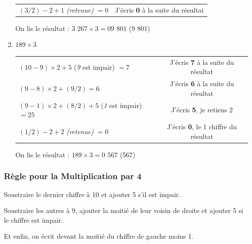 \documentclass[a4paper]{article}
\begin{document}
\begin{small}
\begin{enumerate}
\begin{tabular}{l|c}
		\tabularnewline
		
		$(3 / 2) - 2 + 1$ \textit{(retenue)} $= 0$ & J'écris \textbf{0} à la suite du résultat
		
		\tabularnewline

	\end{tabular}
	
	On lis le résultat : {\boldmath $3$ $267 \times 3 = 09$ $801$} (9 801)\\




	\item $189 \times 3$
	
	\begin{tabular}{l|c}
	
		$(10 - 9) \times 2 + 5$ (\textit{9} est impair) $= 7$ & J'écris \textbf{7} à la suite du résultat
		
		\tabularnewline
		
		$(9 - 8) \times 2 + (9 / 2) = 6$ & J'écris \textbf{6} à la suite du résultat
		
		\tabularnewline
		
		$(9 - 1) \times 2 + (8 / 2) + 5$ (\textit{1} est impair) $= 25$ & J'écris \textbf{5}, je retiens 2
		
		\tabularnewline
		
		$(1 / 2) - 2 + 2$ \textit{(retenue)} $= 0$ & J'écris \textbf{0}, le 1\up{er} chiffre du résultat

	\end{tabular}
	
	On lis le résultat : {\boldmath $189 \times 3 = 0$ $567$} (567)\\

\end{enumerate}
\end{small}

\vfill
{\noindent \dotfill}

\subsubsection*{Règle pour la Multiplication par 4}

Soustraire le dernier chiffre à 10 et ajouter 5 s'il est impair. 

Soustraire les autres à 9, ajouter la moitié de leur voisin de droite et ajouter 5 si le chiffre est impair.

Et enfin, on écrit devant la moitié du chiffre de gauche moins 1.\\
\end{document}
